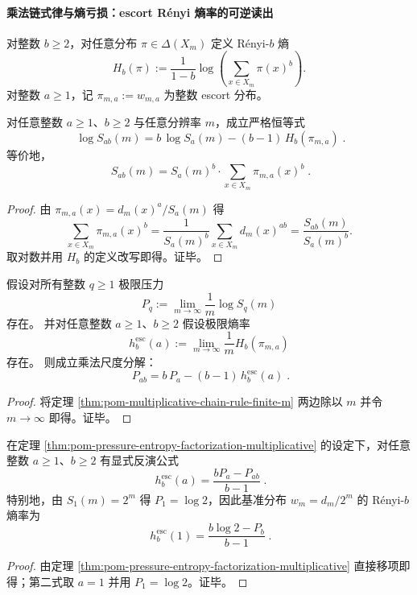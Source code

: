 \paragraph{乘法链式律与熵亏损：escort R\'enyi 熵率的可逆读出}
对整数 \(b\ge 2\)，对任意分布 \(\pi\in\Delta(X_m)\) 定义 R\'enyi-\(b\) 熵
\[
H_b(\pi):=\frac{1}{1-b}\log\!\left(\sum_{x\in X_m}\pi(x)^b\right).
\]
对整数 \(a\ge 1\)，记 \(\pi_{m,a}:=w_{m,a}\) 为整数 escort 分布。

\begin{theorem}\label{thm:pom-multiplicative-chain-rule-finite-m}
对任意整数 \(a\ge 1\)、\(b\ge 2\) 与任意分辨率 \(m\)，成立严格恒等式
\[
\boxed{\;
\log S_{ab}(m)
=
b\,\log S_a(m)-(b-1)\,H_b(\pi_{m,a})\; }.
\]
等价地，
\[
\boxed{\;
S_{ab}(m)=S_a(m)^b\cdot \sum_{x\in X_m}\pi_{m,a}(x)^b\; }.
\]
\end{theorem}
\begin{proof}
由 \(\pi_{m,a}(x)=d_m(x)^a/S_a(m)\) 得
\[
\sum_{x\in X_m}\pi_{m,a}(x)^b
=\frac{1}{S_a(m)^b}\sum_{x\in X_m} d_m(x)^{ab}
=\frac{S_{ab}(m)}{S_a(m)^b}.
\]
取对数并用 \(H_b\) 的定义改写即得。证毕。
\end{proof}

\begin{theorem}\label{thm:pom-pressure-entropy-factorization-multiplicative}
假设对所有整数 \(q\ge 1\) 极限压力
\[
P_q:=\lim_{m\to\infty}\frac{1}{m}\log S_q(m)
\]
存在。
并对任意整数 \(a\ge 1\)、\(b\ge 2\) 假设极限熵率
\[
h^{\mathrm{esc}}_b(a):=\lim_{m\to\infty}\frac{1}{m}H_b(\pi_{m,a})
\]
存在。
则成立乘法尺度分解：
\[
\boxed{\;
P_{ab}=b\,P_a-(b-1)\,h^{\mathrm{esc}}_b(a)\; }.
\]
\end{theorem}
\begin{proof}
将定理 \ref{thm:pom-multiplicative-chain-rule-finite-m} 两边除以 \(m\) 并令 \(m\to\infty\) 即得。证毕。
\end{proof}

\begin{corollary}\label{cor:pom-escort-renyi-rate-inversion}
在定理 \ref{thm:pom-pressure-entropy-factorization-multiplicative} 的设定下，对任意整数 \(a\ge 1\)、\(b\ge 2\) 有显式反演公式
\[
\boxed{\;
h^{\mathrm{esc}}_b(a)=\frac{bP_a-P_{ab}}{b-1}\; }.
\]
特别地，由 \(S_1(m)=2^m\) 得 \(P_1=\log 2\)，因此基准分布 \(w_m=d_m/2^m\) 的 R\'enyi-\(b\) 熵率为
\[
\boxed{\;
h^{\mathrm{esc}}_b(1)=\frac{b\log 2-P_{b}}{b-1}\; }.
\]
\end{corollary}
\begin{proof}
由定理 \ref{thm:pom-pressure-entropy-factorization-multiplicative} 直接移项即得；第二式取 \(a=1\) 并用 \(P_1=\log 2\)。证毕。
\end{proof}

